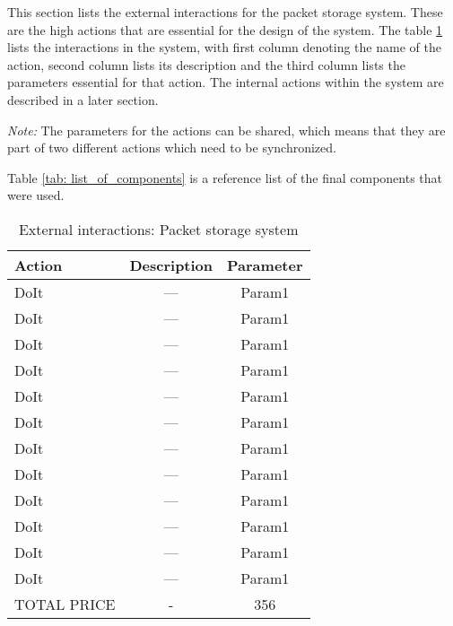 \label{sec:ext_interactions}
This section lists the external interactions for the packet storage system. These are the high actions that are essential for the design of the system. The table \ref{tab: ext_interactions} lists the interactions in the system, with first column denoting the name of the action, second column lists its description and the third column lists the parameters essential for that action. The internal actions within the system are described in a later section.

\textit{Note:} The parameters for the actions can be shared, which means that they are part of two different actions which need to be synchronized.




Table \ref{tab: list_of_components} is a reference list of the final components that were used.

\begin{table}[ht]
\centering
\begin{tabular}{|l|c|c|}\hline
Action & Description & Parameter \\\hline
DoIt & --- & Param1 \\\hline
DoIt & --- & Param1 \\\hline
DoIt & --- & Param1 \\\hline
DoIt & --- & Param1 \\\hline
DoIt & --- & Param1 \\\hline
DoIt & --- & Param1 \\\hline
DoIt & --- & Param1 \\\hline
DoIt & --- & Param1 \\\hline
DoIt & --- & Param1 \\\hline
DoIt & --- & Param1 \\\hline
DoIt & --- & Param1 \\\hline
DoIt & --- & Param1 \\\hline
{TOTAL PRICE} & - & 356 \\\hline
\end{tabular}
\caption{External interactions: Packet storage system }
\label{tab: ext_interactions}
\end{table}